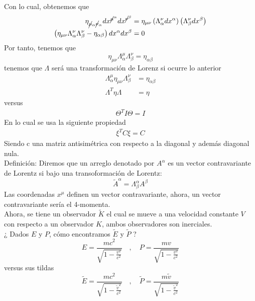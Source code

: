 \documentclass[../main.tex]{subfiles}
\begin{document}
Con lo cual, obtenemos que
\begin{align*}
  \eta_{\cancel{\mu}_\alpha \cancel{\nu}_\alpha} dx^{\cancel{\mu}^\alpha} dx^{\cancel{\nu}^\beta}  & = \eta_{\mu \nu } \left( \Lambda_\alpha^\nu dx^\alpha \right)\left( \Lambda_\beta^\nu dx^\beta \right) \\
  \left(\eta_{\mu \nu}\Lambda_\alpha^\nu \Lambda_\beta^\nu-\eta_{\alpha \beta}\right)dx^\alpha dx^\beta & = 0
\end{align*}
Por tanto, tenemos que
\begin{equation}
  \eta_{\mu \nu} \Lambda^\mu_\alpha \Lambda_\beta^\nu = \eta_{\alpha \beta}
\end{equation}
tenemos que $\Lambda$ será una transformación de Lorenz si ocurre lo anterior
\begin{align*}
 \Lambda_\alpha^\mu \eta_{\mu \nu} \Lambda_\beta^\nu & = \eta_{\alpha \beta} \\
  \Lambda^T \eta \Lambda & = \eta 
\end{align*}
versus 
\begin{align*}
  \Theta^T I \Theta = I
\end{align*}
En lo cual se usa la siguiente propiedad
\begin{align*}
  \xi^T C \xi = C 
\end{align*}
Siendo c una matriz antisimétrica con respecto a la diagonal y además diagonal nula. \\
Definición: Diremos que un arreglo denotado por $A^\alpha$ es un vector contravariante de Lorentz si bajo una transoformación de Lorentz: 
\begin{equation}
  \tilde{A}^\alpha = \Lambda_\beta^\alpha A^\beta
\end{equation}
Las coordenadas $x^\mu$ definen un vector contravariante, ahora, un vector contravariante sería el 4-momenta. \\
Ahora, se tiene un observador $\tilde{K}$ el cual se mueve a una velocidad constante $V$ con respecto a un observador $K$, ambos observadores son inerciales. \\
¿ Dados $E$ y $P$, cómo encontramos $\tilde{E}$ y $\tilde{P}$ ? 
\begin{equation*}
  E= \frac{mc^2}{\sqrt{1-\frac{v^2}{c^2}}} \quad , \quad P=\frac{mv}{\sqrt{1-\frac{v^2}{c^2}}}
\end{equation*}
versus sus tildas
\begin{equation*}
  \tilde{E} = \frac{mc^2}{\sqrt{1-\frac{\tilde{v}^2}{c^2}}}\quad , \quad \tilde{P}= \frac{m\tilde{v}}{\sqrt{1-\frac{\tilde{v}^2}{c^2}}}
\end{equation*}
\end{document}
